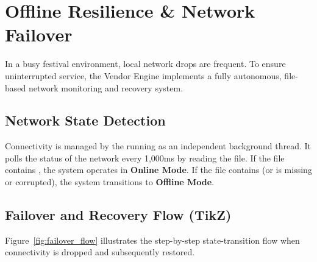 
\section{Offline Resilience \& Network Failover}
\label{sec:offline_resilience}

In a busy festival environment, local network drops are frequent. To ensure uninterrupted service, the Vendor Engine implements a fully autonomous, file-based network monitoring and recovery system.

\subsection{Network State Detection}
Connectivity is managed by the  running as an independent background thread. It polls the status of the network every 1,000ms by reading the  file. If the file contains , the system operates in \textbf{Online Mode}. If the file contains  (or is missing or corrupted), the system transitions to \textbf{Offline Mode}.

\subsection{Failover and Recovery Flow (TikZ)}
Figure~\ref{fig:failover_flow} illustrates the step-by-step state-transition flow when connectivity is dropped and subsequently restored.

